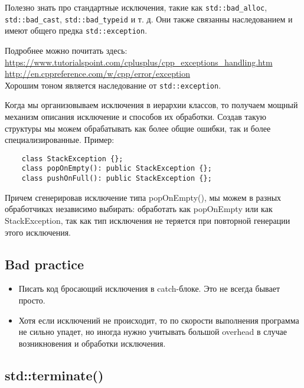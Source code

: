 Полезно знать про стандартные исключения, такие как  \texttt{std::bad_alloc}, \texttt{std::bad_cast}, \texttt{std::bad_typeid} и т. д. Они также связанны наследованием и имеют общего предка \texttt{std::exception}.

Подробнее можно почитать здесь: \\
\url{https://www.tutorialspoint.com/cplusplus/cpp_exceptions_handling.htm} \\
\url{http://en.cppreference.com/w/cpp/error/exception} \\

Хорошим тоном является наследование от \texttt{std::exception}.

Когда мы организовываем исключения в иерархии классов, то получаем мощный механизм описания исключение и способов их обработки. Создав такую структуры мы можем обрабатывать как более общие ошибки, так и более специализированные.
Пример:
\begin{verbatim}
    class StackException {};
    class popOnEmpty(): public StackException {};
    class pushOnFull(): public StackException {};
\end{verbatim}
	Причем сгенерировав исключение типа popOnEmpty(), мы можем в разных обработчиках независимо выбирать: обработать как popOnEmpty или как StackException, так как тип исключения не теряется при повторной генерации этого исключения.

\subsection{Bad practice}
\begin{itemize}
\item
Писать код бросающий исключения в catch-блоке. Это не всегда бывает просто.
\item
Хотя если исключений не происходит, то по скорости выполнения программа не сильно упадет, но иногда нужно учитывать большой overhead в случае возникновения и обработки исключения.
\end{itemize}

\subsection{std::terminate()}

